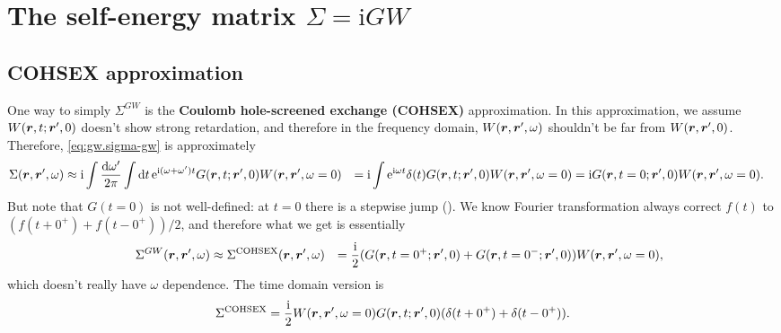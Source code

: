 \documentclass[hyperref, a4paper, 12pt]{report}
\newcommand*{\ii}{\mathrm{i}}
\newcommand*{\ee}{\mathrm{e}}
\newcommand*{\concept}[1]{{\textbf{#1}}}
\def\\{}%
\begin{document}
\section{The self-energy matrix $\Sigma = \ii GW$}

\subsection{COHSEX approximation}\label{sec:cohsex-approx-1}

One way to simply $\Sigma^{GW}$ is the 
\concept{Coulomb hole-screened exchange (COHSEX)} approximation.
In this approximation, 
we assume $W(\vb*{r}, t; \vb*{r}', 0)$ doesn't show strong retardation,
and therefore in the frequency domain, 
$W(\vb*{r}, \vb*{r}', \omega)$ shouldn't be far from $W(\vb*{r}, \vb*{r}', 0)$.
Therefore, \eqref{eq:gw.sigma-gw} is approximately 
\[
    \begin{aligned}
        \Sigma(\vb*{r}, \vb*{r}', \omega) &\approx \ii 
        \int \frac{\dd{\omega'}}{2\pi} \int \dd{t} \ee^{\ii (\omega + \omega') t} 
        G(\vb*{r}, t; \vb*{r}', 0) W(\vb*{r}, \vb*{r}', \omega = 0) \\
        &= \ii \int \ee^{\ii \omega t} \delta(t) G(\vb*{r}, t; \vb*{r}', 0) W(\vb*{r}, \vb*{r}', \omega = 0) \\
        &= \ii G(\vb*{r}, t = 0; \vb*{r}', 0) W(\vb*{r}, \vb*{r}', \omega = 0).
    \end{aligned}
\]
But note that $G(t = 0)$ is not well-defined: 
at $t = 0$ there is a stepwise jump ().
We know Fourier transformation 
always correct $f(t)$ to $(f(t + 0^+) + f(t - 0^+)) / 2$,
and therefore what we get is essentially 
\begin{equation}
    \begin{aligned}
        &\quad \Sigma^{GW}(\vb*{r}, \vb*{r}', \omega) \approx
        \Sigma^{\text{COHSEX}} (\vb*{r}, \vb*{r}', \omega) \\
        &= \frac{\ii}{2} (
            G(\vb*{r}, t = 0^+; \vb*{r}', 0) + 
            G(\vb*{r}, t = 0^-; \vb*{r}', 0)
        ) W(\vb*{r}, \vb*{r}', \omega = 0),
    \end{aligned}
\end{equation}
which doesn't really have $\omega$ dependence.
The time domain version is 
\begin{equation}
    \Sigma^{\text{COHSEX}} = \frac{\ii}{2}
    W(\vb*{r}, \vb*{r}', \omega = 0)
    G(\vb*{r}, t; \vb*{r}', 0)
    (\delta(t + 0^+) + \delta(t - 0^+)).
\end{equation}
\end{document}

